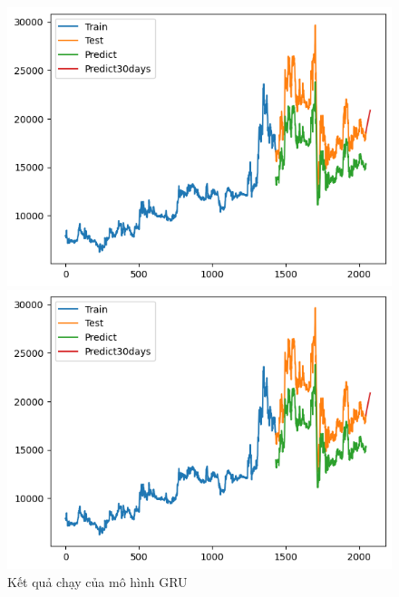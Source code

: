 \begin{figure}[H]
\begin{minipage}{0.15\textwidth}
    \includegraphics[width=1\textwidth]{resources/chapter-5/result/EXIM-GRU_7-3.png}
    \end{minipage}
    \hfill
        \begin{minipage}{0.15\textwidth}
    \centering
    \includegraphics[width=1\textwidth]{resources/chapter-5/result/EXIM-GRU_7-3.png}
    \end{minipage}
    \hfill
    
    \caption{Kết quả chạy của mô hình GRU}
    \label{fig:GRU}
\end{figure}



